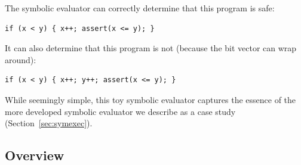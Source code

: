 \documentclass[acmsmall,screen,nonacm]{acmart}
\theoremstyle{definition}
\begin{document}
The symbolic evaluator can correctly determine that this program is safe:
\begin{lstlisting}
if (x < y) { x++; assert(x <= y); }
\end{lstlisting}
It can also determine that this program is not (because the bit vector  can wrap around):
\begin{lstlisting}
if (x < y) { x++; y++; assert(x <= y); }
\end{lstlisting}
While seemingly simple, this toy symbolic evaluator captures the essence of the
more developed symbolic evaluator we describe as a case study
(Section~\ref{sec:symexec}).

\subsection{Overview}\label{sec:features}
\end{document}
